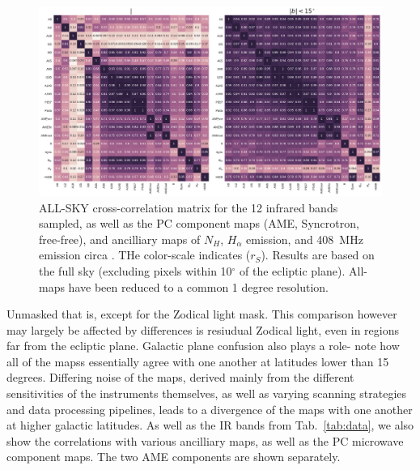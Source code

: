        \begin{figure}
          \includegraphics[width=\textwidth]{../Plots/ch_allsky/all_bands_corr_matrix_wAME_spearmanintensity_unmasked.pdf}
          \centering
          \caption{ALL-SKY cross-correlation matrix for the 12 infrared bands sampled, as well as the PC component maps (AME, Syncrotron, free-free), and ancilliary maps of $N_{H}$, $H_{\alpha}$ emission, and 408~MHz emission circa \cite{haslam82}. THe color-scale indicates ($r_{S}$). Results are based on the full sky (excluding pixels within 10$^{\circ}$ of the ecliptic plane). All-maps have been reduced to a common 1 degree resolution.}
          \label{fig:all_bands_corr_matrix_wAME_spearman}
        \end{figure}
        Unmasked that is, except for the Zodical light mask. This comparison however may largely be affected by differences is resiudual Zodical light, even in regions far from the ecliptic plane. Galactic plane confusion also plays a role- note how all of the mapss essentially agree with one another at latitudes lower than 15 degrees. Differing noise of the maps, derived mainly from the different sensitivities of the instruments themselves, as well as varying scanning strategies and data processing pipelines, leads to a divergence of the maps with one another at higher galactic latitudes. As well as the IR bands from Tab.~\ref{tab:data}, we also show the correlations with various ancilliary maps, as well as the PC microwave component maps. The two AME components are shown separately.

